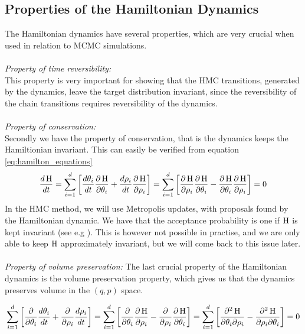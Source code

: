 \subsection{Properties of the Hamiltonian Dynamics}
The Hamiltonian dynamics have several properties, which are very crucial when used in relation to MCMC simulations.\\
\\
\textit{Property of time reversibility:}\\
This property is very important for showing that the HMC transitions, generated by the dynamics, leave the target distribution invariant, since the reversibility of the chain transitions requires reversibility of the dynamics. \\
\\
\textit{Property of conservation:}\\
Secondly we have the property of conservation, that is the dynamics keeps the Hamiltionian invariant. This can easily be verified from equation \ref{eq:hamilton_equations}
\begin{equation}\label{eq:Hamilton_conservation}
    \frac{d \operatorname{H}}{d t}=\sum_{i=1}^{d}\left[\frac{d \theta_{i}}{d t} \frac{\partial \operatorname{H}}{\partial \theta_{i}}+\frac{d \rho_{i}}{d t} \frac{\partial \operatorname{H}}{\partial \rho_{i}}\right]=\sum_{i=1}^{d}\left[\frac{\partial \operatorname{H}}{\partial \rho_{i}} \frac{\partial \operatorname{H}}{\partial \theta_{i}}-\frac{\partial \operatorname{H}}{\partial \theta_{i}} \frac{\partial \operatorname{H}}{\partial \rho_{i}}\right]=0
\end{equation}
In the HMC method, we will use Metropolis updates, with proposals found by the Hamiltonian dynamic. We have that the acceptance probability is one if $\operatorname{H}$ is kept invariant (see e.g \cite{neal2012mcmc}). This is however not possible in practise, and we are only able to keep $\operatorname{H}$ approximately invariant, but we will come back to this issue later. \\
\\
\textit{Property of volume preservation:}
The last crucial property of the Hamiltonian dynamics is the volume preservation property, which gives us that the dynamics preserves volume in the $(q,p)$ space.

\begin{equation*}
    \sum_{i=1}^{d}\left[\frac{\partial}{\partial \theta_{i}} \frac{d \theta_{i}}{d t}+\frac{\partial}{\partial \rho_{i}} \frac{d \rho_{i}}{d t}\right]=\sum_{i=1}^{d}\left[\frac{\partial}{\partial \theta_{i}} \frac{\partial \operatorname{H}}{\partial \rho_{i}}-\frac{\partial}{\partial \rho_{i}} \frac{\partial \operatorname{H}}{\partial \theta_{i}}\right]=\sum_{i=1}^{d}\left[\frac{\partial^{2} \operatorname{H}}{\partial \theta_{i} \partial \rho_{i}}-\frac{\partial^{2} \operatorname{H}}{\partial \rho_{i} \partial \theta_{i}}\right]=0
\end{equation*}

